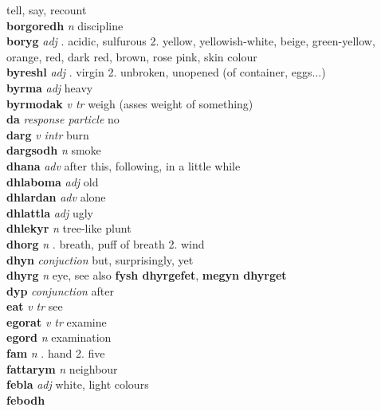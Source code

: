\textperiodcentered tell, say, recount\\\textbf{borgoredh}   \emph{n} \textperiodcentered discipline\\\textbf{boryg}   \emph{adj} . acidic, sulfurous 2. yellow, yellowish-white, beige, green-yellow, orange, red, dark red, brown, rose pink, skin colour \\\textbf{byreshl}   \emph{adj} . virgin 2. unbroken, unopened (of container, eggs...) \\\textbf{byrma}   \emph{adj} \textperiodcentered heavy\\\textbf{byrmodak}   \emph{v tr} \textperiodcentered weigh (asses weight of something)\\\textbf{da}   \emph{response particle} \textperiodcentered no\\\textbf{darg}   \emph{v intr} \textperiodcentered burn\\\textbf{dargsodh}   \emph{n} \textperiodcentered smoke\\\textbf{dhana}   \emph{adv} \textperiodcentered after this, following, in a little while\\\textbf{dhlaboma}   \emph{adj} \textperiodcentered old\\\textbf{dhlardan}   \emph{adv} \textperiodcentered alone\\\textbf{dhlattla}   \emph{adj} \textperiodcentered ugly\\\textbf{dhlekyr}   \emph{n} \textperiodcentered tree-like plunt\\\textbf{dhorg}   \emph{n} . breath, puff of breath 2. wind \\\textbf{dhyn}   \emph{conjuction} \textperiodcentered but, surprisingly, yet\\\textbf{dhyrg}   \emph{n} \textperiodcentered eye, see also \textbf{fysh dhyrgefet}, \textbf{megyn dhyrget}\\\textbf{dyp}   \emph{conjunction} \textperiodcentered after\\\textbf{eat}   \emph{v tr} \textperiodcentered see\\\textbf{egorat}   \emph{v tr} \textperiodcentered examine\\\textbf{egord}   \emph{n} \textperiodcentered examination\\\textbf{fam}   \emph{n} . hand 2. five \\\textbf{fattarym}   \emph{n} \textperiodcentered neighbour\\\textbf{febla}   \emph{adj} \textperiodcentered white, light colours\\\textbf{febodh} 